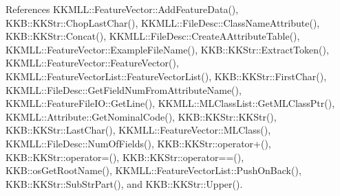References K\+K\+M\+L\+L\+::\+Feature\+Vector\+::\+Add\+Feature\+Data(), K\+K\+B\+::\+K\+K\+Str\+::\+Chop\+Last\+Char(), K\+K\+M\+L\+L\+::\+File\+Desc\+::\+Class\+Name\+Attribute(), K\+K\+B\+::\+K\+K\+Str\+::\+Concat(), K\+K\+M\+L\+L\+::\+File\+Desc\+::\+Create\+A\+Attribute\+Table(), K\+K\+M\+L\+L\+::\+Feature\+Vector\+::\+Example\+File\+Name(), K\+K\+B\+::\+K\+K\+Str\+::\+Extract\+Token(), K\+K\+M\+L\+L\+::\+Feature\+Vector\+::\+Feature\+Vector(), K\+K\+M\+L\+L\+::\+Feature\+Vector\+List\+::\+Feature\+Vector\+List(), K\+K\+B\+::\+K\+K\+Str\+::\+First\+Char(), K\+K\+M\+L\+L\+::\+File\+Desc\+::\+Get\+Field\+Num\+From\+Attribute\+Name(), K\+K\+M\+L\+L\+::\+Feature\+File\+I\+O\+::\+Get\+Line(), K\+K\+M\+L\+L\+::\+M\+L\+Class\+List\+::\+Get\+M\+L\+Class\+Ptr(), K\+K\+M\+L\+L\+::\+Attribute\+::\+Get\+Nominal\+Code(), K\+K\+B\+::\+K\+K\+Str\+::\+K\+K\+Str(), K\+K\+B\+::\+K\+K\+Str\+::\+Last\+Char(), K\+K\+M\+L\+L\+::\+Feature\+Vector\+::\+M\+L\+Class(), K\+K\+M\+L\+L\+::\+File\+Desc\+::\+Num\+Of\+Fields(), K\+K\+B\+::\+K\+K\+Str\+::operator+(), K\+K\+B\+::\+K\+K\+Str\+::operator=(), K\+K\+B\+::\+K\+K\+Str\+::operator==(), K\+K\+B\+::os\+Get\+Root\+Name(), K\+K\+M\+L\+L\+::\+Feature\+Vector\+List\+::\+Push\+On\+Back(), K\+K\+B\+::\+K\+K\+Str\+::\+Sub\+Str\+Part(), and K\+K\+B\+::\+K\+K\+Str\+::\+Upper().


